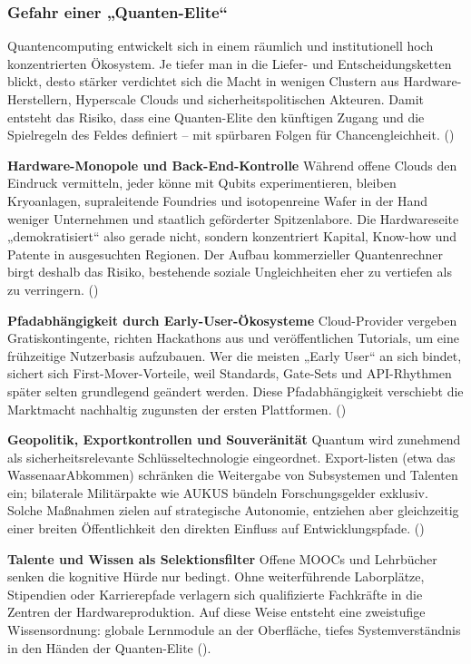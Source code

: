 \subsubsection{Gefahr einer „Quanten-Elite“}
Quantencomputing entwickelt sich in einem räumlich und institutionell hoch konzentrierten Ökosystem. Je tiefer man in die Liefer- und Entscheidungsketten blickt, desto stärker verdichtet sich die Macht in wenigen Clustern aus Hardware-Herstellern, Hyperscale Clouds und sicherheitspolitischen Akteuren. Damit entsteht das Risiko, dass eine Quanten-Elite den künftigen Zugang und die Spielregeln des Feldes definiert – mit spürbaren Folgen für Chancengleichheit. (\cite{seskirDemocratizationQuantumTechnologies2022})

\textbf{Hardware-Monopole und Back-End-Kontrolle}
Während offene Clouds den Eindruck vermitteln, jeder könne mit Qubits experimentieren, bleiben Kryoanlagen, supraleitende Foundries und isotopenreine Wafer in der Hand weniger Unternehmen und staatlich geförderter Spitzenlabore. Die Hardwareseite „demokratisiert“ also gerade nicht, sondern konzentriert Kapital, Know-how und Patente in ausgesuchten Regionen. Der Aufbau kommerzieller Quantenrechner birgt deshalb das Risiko, bestehende soziale Ungleichheiten eher zu vertiefen als zu verringern. (\cite{seskirDemocratizationQuantumTechnologies2022})

\textbf{Pfadabhängigkeit durch Early-User-Ökosysteme}
Cloud-Provider vergeben Gratiskontingente, richten Hackathons aus und veröffentlichen Tutorials, um eine frühzeitige Nutzerbasis aufzubauen. Wer die meisten „Early User“ an sich bindet, sichert sich First-Mover-Vorteile, weil Standards, Gate-Sets und API-Rhythmen später selten grundlegend geändert werden. Diese Pfadabhängigkeit verschiebt die Marktmacht nachhaltig zugunsten der ersten Plattformen. (\cite{seskirDemocratizationQuantumTechnologies2022})

\textbf{Geopolitik, Exportkontrollen und Souveränität}
Quantum wird zunehmend als sicherheitsrelevante Schlüsseltechnologie eingeordnet. Export-listen (etwa das WassenaarAbkommen) schränken die Weitergabe von Subsystemen und Talenten ein; bilaterale Militärpakte wie AUKUS bündeln Forschungsgelder exklusiv. Solche Maßnahmen zielen auf strategische Autonomie, entziehen aber gleichzeitig einer breiten Öffentlichkeit den direkten Einfluss auf Entwicklungspfade. (\cite{seskirDemocratizationQuantumTechnologies2022})

\textbf{Talente und Wissen als Selektionsfilter}
Offene MOOCs und Lehrbücher senken die kognitive Hürde nur bedingt. Ohne weiterführende Laborplätze, Stipendien oder Karrierepfade verlagern sich qualifizierte Fachkräfte in die Zentren der Hardwareproduktion. Auf diese Weise entsteht eine zweistufige Wissensordnung: globale Lernmodule an der Oberfläche, tiefes Systemverständnis in den Händen der Quanten-Elite (\cite{seskirDemocratizationQuantumTechnologies2022}).

